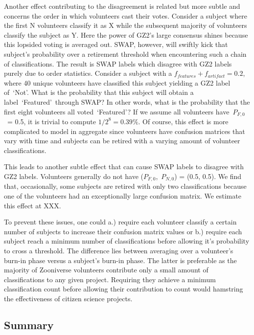 \documentclass[twocolumn]{aastex6}
\newcommand{\Pf}{$P_{F,0}$}
\newcommand{\Pn}{$P_{N,0}$}
\newcommand{\feat}{`Featured'}
\newcommand{\notfeat}{`Not'}
\begin{document}
Another effect contributing to the disagreement is related but more subtle and 
concerns the order in which volunteers cast their votes. Consider a subject where
the first N volunteers classify it as X while the subsequent majority of volunteers classify
the subject as Y. Here the power of GZ2's large consensus shines because this lopsided 
voting is averaged out. SWAP, however, will swiftly kick that subject's probability 
over a retirement threshold when encountering such a chain of classifications. 
The result is SWAP labels which disagree with GZ2 labels purely due to order statistics. 
Consider a subject with a $f_{features}+f_{artifact} = 0.2$, where 40 unique volunteers have
classified this subject yielding a GZ2 label of~\notfeat. What is the probability that 
this subject will obtain a label~\feat~through SWAP? In other words, what is the 
probability that the first eight volunteers all voted~\feat?  If we assume all volunteers
have~\Pf~= 0.5, it is trivial to compute $1/2^8 = 0.39\%$. Of course, this effect is more
complicated to model in aggregate since volunteers have confusion matrices that vary 
with time and subjects can be retired with a varying amount of volunteer classifications. 

This leads to another subtle effect that can cause SWAP labels to disagree with GZ2 labels.
Volunteers generally do not have (\Pf,~\Pn) = (0.5, 0.5). We find that, occasionally, some 
subjects are retired with only two classifications because one of the volunteers had 
an exceptionally large confusion matrix. We estimate this effect at XXX. 

To prevent these issues, one could a.) require each volunteer classify a certain 
number of subjects to increase their confusion matrix values or
b.) require each subject reach a minimum number of classifications before allowing 
it's probability to cross a threshold. The difference lies between averaging over a 
volunteer's burn-in phase versus a subject's burn-in phase.
The latter is preferable as the majority of Zooniverse volunteers contribute only 
a small amount of classifications to any given project. Requiring they achieve a 
minimum classification count before allowing their contribution to count would 
hamstring the effectiveness of citizen science projects. 


\subsection{Summary}
\end{document}
